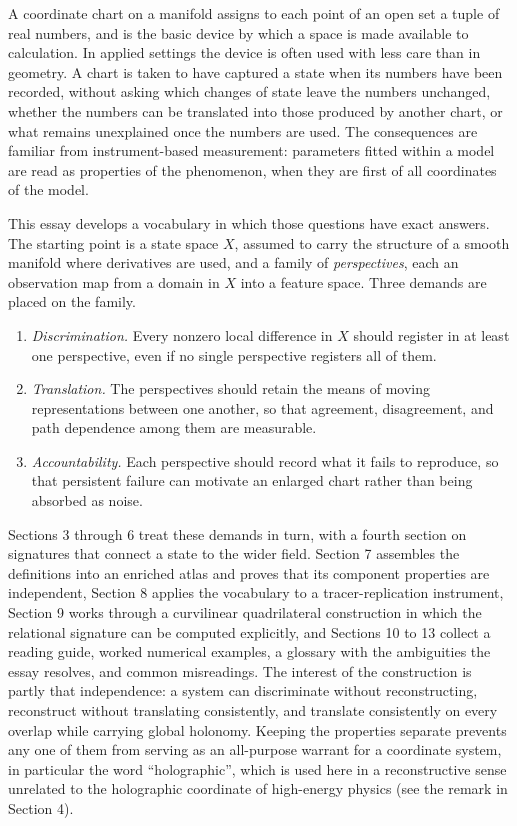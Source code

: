 \documentclass[11pt]{article}
\theoremstyle{remark}
\begin{document}
A coordinate chart on a manifold assigns to each point of an open set a tuple of real numbers, and is the basic device by which a space is made available to calculation. In applied settings the device is often used with less care than in geometry. A chart is taken to have captured a state when its numbers have been recorded, without asking which changes of state leave the numbers unchanged, whether the numbers can be translated into those produced by another chart, or what remains unexplained once the numbers are used. The consequences are familiar from instrument-based measurement: parameters fitted within a model are read as properties of the phenomenon, when they are first of all coordinates of the model.

This essay develops a vocabulary in which those questions have exact answers. The starting point is a state space $X$, assumed to carry the structure of a smooth manifold where derivatives are used, and a family of \emph{perspectives}, each an observation map from a domain in $X$ into a feature space. Three demands are placed on the family.

\begin{enumerate}[label=(\roman*)]
\item \emph{Discrimination.} Every nonzero local difference in $X$ should register in at least one perspective, even if no single perspective registers all of them.
\item \emph{Translation.} The perspectives should retain the means of moving representations between one another, so that agreement, disagreement, and path dependence among them are measurable.
\item \emph{Accountability.} Each perspective should record what it fails to reproduce, so that persistent failure can motivate an enlarged chart rather than being absorbed as noise.
\end{enumerate}

Sections 3 through 6 treat these demands in turn, with a fourth section on signatures that connect a state to the wider field. Section 7 assembles the definitions into an enriched atlas and proves that its component properties are independent, Section 8 applies the vocabulary to a tracer-replication instrument, Section 9 works through a curvilinear quadrilateral construction in which the relational signature can be computed explicitly, and Sections 10 to 13 collect a reading guide, worked numerical examples, a glossary with the ambiguities the essay resolves, and common misreadings. The interest of the construction is partly that independence: a system can discriminate without reconstructing, reconstruct without translating consistently, and translate consistently on every overlap while carrying global holonomy. Keeping the properties separate prevents any one of them from serving as an all-purpose warrant for a coordinate system, in particular the word ``holographic'', which is used here in a reconstructive sense unrelated to the holographic coordinate of high-energy physics (see the remark in Section 4).
\end{document}
